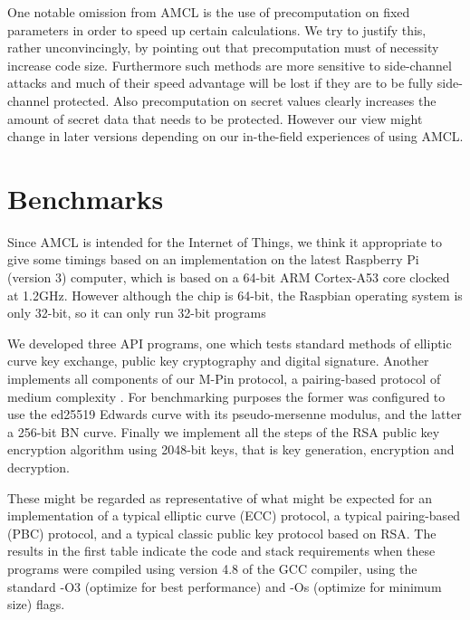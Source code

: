 \documentclass{llncs}
\begin{document}
One notable omission from AMCL is the use of precomputation on fixed parameters in order to speed up certain calculations. We try to justify this, rather unconvincingly, by pointing out 
that precomputation must of necessity increase code size. Furthermore such methods are more sensitive to side-channel attacks and much of their speed advantage will be lost if they are to be 
fully side-channel protected. Also precomputation on secret values clearly increases the amount of secret data that needs to be protected.
However our view might change in later versions depending on our in-the-field experiences of using AMCL.




\newpage
\appendix

\section*{Benchmarks}

Since AMCL is intended for the Internet of Things, we think it appropriate to give some timings based on an implementation on the latest Raspberry Pi (version 3) computer, which is
based on a 64-bit ARM Cortex-A53 core clocked at 1.2GHz. However although the chip is 64-bit, the Raspbian operating system is only 32-bit, so it can only run 32-bit programs 

We developed three API programs, one which tests standard methods of elliptic curve key exchange, public key cryptography and digital signature. Another implements all components of our M-Pin protocol,
a pairing-based protocol of medium complexity \cite{mpin}.  For benchmarking purposes the former was configured to use the ed25519 Edwards curve \cite{bernstein-duif-lange-schwabe-yang} with its pseudo-mersenne modulus, 
and the latter a 256-bit BN curve.
Finally we implement all the steps of the RSA public key encryption algorithm using 2048-bit keys, that is key generation, encryption and decryption.

These might be regarded as representative of what might be expected for an implementation of a typical elliptic curve (ECC) protocol, a typical pairing-based (PBC) protocol, and a typical classic 
public key protocol based on RSA.
The results in the first table indicate the code and stack requirements when these programs were compiled using version 4.8 of the GCC compiler, using the standard  -O3 (optimize for best performance) and -Os
(optimize for minimum size) flags.
\end{document}
